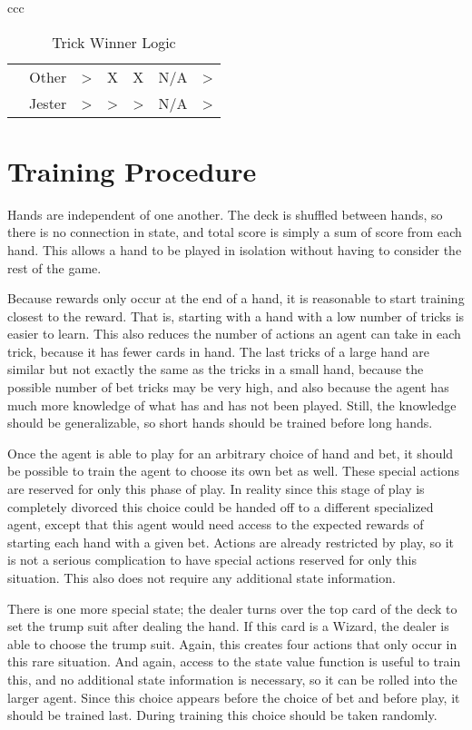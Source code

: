 \documentclass[10pt]{article} %
\begin{document}
\begin{table}[h!]
\begin{tabular}{ccc}
\begin{tabular}{rrccccc}
                          & \multicolumn{1}{r|}{Other}  & \multicolumn{1}{c|}{\textgreater{}} & \multicolumn{1}{c|}{X}              & \multicolumn{1}{c|}{X}              & \multicolumn{1}{c|}{N/A} & \multicolumn{1}{c|}{\textgreater{}} \\ \cline{3-7} 
                          & \multicolumn{1}{r|}{Jester} & \multicolumn{1}{c|}{\textgreater{}} & \multicolumn{1}{c|}{\textgreater{}} & \multicolumn{1}{c|}{\textgreater{}} & \multicolumn{1}{c|}{N/A} & \multicolumn{1}{c|}{\textgreater{}} \\ \cline{3-7} 
\end{tabular}
\end{tabular}
\caption{Trick Winner Logic}
\label{tab:trickwinner}
\end{table}

\section{Training Procedure}

Hands are independent of one another. The deck is shuffled between hands, so there is no connection in state, and total score is simply a sum of score from each hand. This allows a hand to be played in isolation without having to consider the rest of the game.

Because rewards only occur at the end of a hand, it is reasonable to start training closest to the reward. That is, starting with a hand with a low number of tricks is easier to learn. This also reduces the number of actions an agent can take in each trick, because it has fewer cards in hand. The last tricks of a large hand are similar but not exactly the same as the tricks in a small hand, because the possible number of bet tricks may be very high, and also because the agent has much more knowledge of what has and has not been played. Still, the knowledge should be generalizable, so short hands should be trained before long hands.

Once the agent is able to play for an arbitrary choice of hand and bet, it should be possible to train the agent to choose its own bet as well. These special actions are reserved for only this phase of play. In reality since this stage of play is completely divorced this choice could be handed off to a different specialized agent, except that this agent would need access to the expected rewards of starting each hand with a given bet. Actions are already restricted by play, so it is not a serious complication to have special actions reserved for only this situation. This also does not require any additional state information.

There is one more special state; the dealer turns over the top card of the deck to set the trump suit after dealing the hand. If this card is a Wizard, the dealer is able to choose the trump suit. Again, this creates four actions that only occur in this rare situation. And again, access to the state value function is useful to train this, and no additional state information is necessary, so it can be rolled into the larger agent. Since this choice appears before the choice of bet and before play, it should be trained last. During training this choice should be taken randomly.
\end{document}
